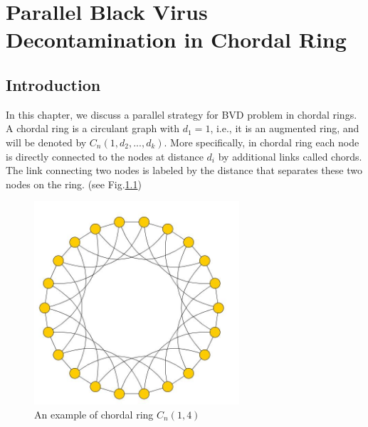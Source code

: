 


\chapter {Parallel Black Virus Decontamination in Chordal Ring}
\label{TL}
 

\section{Introduction}
In this chapter, we discuss a parallel strategy for  BVD problem in chordal rings. A chordal ring is a circulant graph with $d_1=1$, i.e., it is an augmented ring, and will be denoted by $C_n(1, d_2, ..., d_k)$. More specifically, in chordal ring each node is directly connected to the nodes at distance $d_i$ by additional links called chords. The link connecting two nodes is labeled by the distance that separates these two nodes on the ring. (see Fig.\ref{fig:chordalring})
 
\begin{figure}[H]
  \centering  
  \includegraphics[width=3in]{figures/chordalring.png}
  \caption{An example of chordal ring $C_n(1,4)$}\label{fig:chordalring}
\end{figure}

